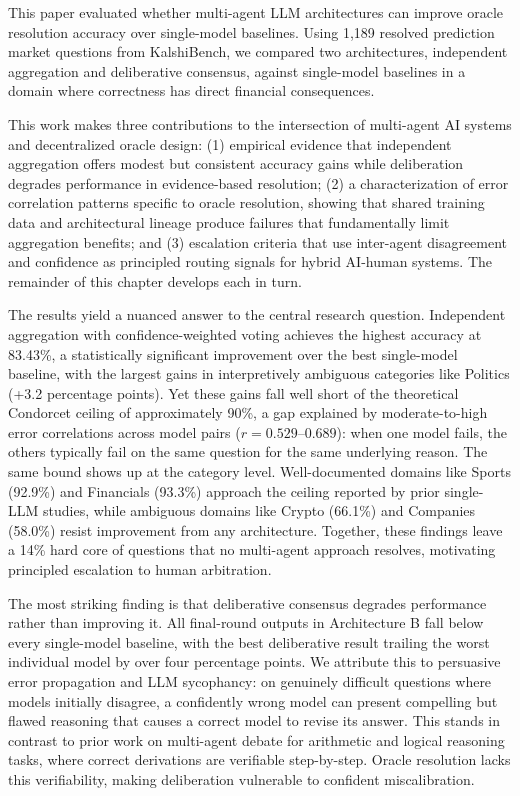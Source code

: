 This paper evaluated whether multi-agent LLM architectures can 
improve oracle resolution accuracy over single-model baselines. 
Using 1,189 resolved prediction market questions from KalshiBench, 
we compared two architectures, independent aggregation and 
deliberative consensus, against single-model baselines in a domain 
where correctness has direct financial consequences.

This work makes three contributions to the intersection of multi-agent 
AI systems and decentralized oracle design: (1) empirical evidence 
that independent aggregation offers modest but consistent accuracy 
gains while deliberation degrades performance in evidence-based 
resolution; (2) a characterization of error correlation patterns 
specific to oracle resolution, showing that shared training data and 
architectural lineage produce failures that fundamentally limit 
aggregation benefits; and (3) escalation criteria that use inter-agent 
disagreement and confidence as principled routing signals for hybrid 
AI-human systems. The remainder of this chapter develops each in turn.

The results yield a nuanced answer to the central research question. 
Independent aggregation with confidence-weighted voting achieves the 
highest accuracy at 83.43\%, a statistically significant improvement 
over the best single-model baseline, with the largest gains in 
interpretively ambiguous categories like Politics (+3.2 percentage 
points). Yet these gains fall well short of the theoretical Condorcet 
ceiling of approximately 90\%, a gap explained by moderate-to-high 
error correlations across model pairs ($r = 0.529$--$0.689$): when 
one model fails, the others typically fail on the same question for 
the same underlying reason. The same bound shows up at the category 
level. Well-documented domains like Sports (92.9\%) and Financials 
(93.3\%) approach the ceiling reported by prior single-LLM studies, 
while ambiguous domains like Crypto (66.1\%) and Companies (58.0\%) 
resist improvement from any architecture. Together, these findings 
leave a 14\% hard core of questions that no multi-agent approach 
resolves, motivating principled escalation to human arbitration.

The most striking finding is that deliberative consensus degrades performance rather than improving it. All final-round outputs in Architecture B fall below every single-model baseline, with the best deliberative result trailing the worst individual model by over four percentage points. We attribute this to persuasive error propagation and LLM sycophancy: on genuinely difficult questions where models initially disagree, a confidently wrong model can present compelling but flawed reasoning that causes a correct model to revise its answer. This stands in contrast to prior work on multi-agent debate for arithmetic and logical reasoning tasks, where correct derivations are verifiable step-by-step. Oracle resolution lacks this verifiability, making deliberation vulnerable to confident miscalibration.


